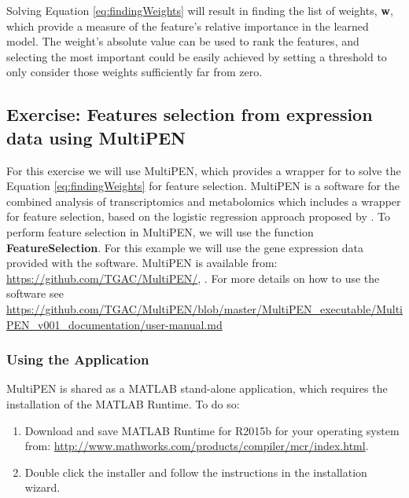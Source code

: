 \documentclass[11pt, oneside]{article}   	%
\begin{document}
Solving Equation \ref{eq:findingWeights} will result in finding the list of weights, {\bf w}, which provide a measure of the feature's relative importance in the learned model. The weight's absolute value can be used to rank the features, and selecting the most important could be easily achieved by setting a threshold to only consider those weights sufficiently far from zero. 


\subsection{Exercise: Features selection from expression data using MultiPEN}

For this exercise we will use MultiPEN, which provides a wrapper for to solve the Equation \ref{eq:findingWeights} for feature selection. 
MultiPEN is a software for the combined analysis of transcriptomics and metabolomics which includes a wrapper for feature selection, based on the logistic regression approach proposed by \cite{Vlassis2015}.
To perform feature selection in MultiPEN, we will use the function {\bf FeatureSelection}. 
For this example we will use the gene expression data provided with the software. 
MultiPEN is available from: \url{https://github.com/TGAC/MultiPEN/}, \cite{Rey2017}. For more details on how to use the software see \url{https://github.com/TGAC/MultiPEN/blob/master/MultiPEN_executable/MultiPEN_v001_documentation/user-manual.md}


\subsubsection{Using the Application}


MultiPEN is shared as a MATLAB stand-alone application, which requires the installation of the MATLAB Runtime. To do so:

\begin{enumerate}

   \item Download and save MATLAB Runtime for R2015b for your operating system from: \url{http://www.mathworks.com/products/compiler/mcr/index.html}.

   \item Double click the installer and follow the instructions in the installation wizard.

\end{enumerate}
\end{document}

